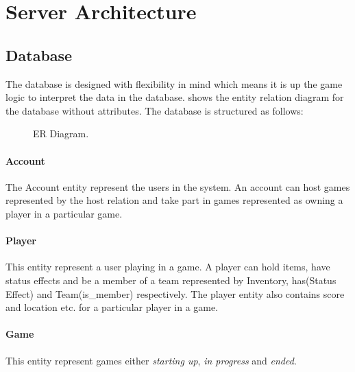 \section{Server Architecture}





\subsection{Database}
The database is designed with flexibility in mind which means it is up the game logic to interpret the data in the database.  shows the entity relation diagram for the database without attributes. The database is structured as follows:

\begin{figure}
  \centering
    
  \caption{ER Diagram.}
  \label{fig:ER}
\end{figure}




\paragraph{Account}
The Account entity represent the users in the system. An account can host games represented by the host relation and take part in games represented as owning a player in a particular game.

\paragraph{Player}
This entity represent a user playing in a game. A player can hold items, have status effects and be a member of a team represented by Inventory, has(Status Effect) and Team(is\_member) respectively. The player entity also contains score and location etc. for a particular player in a game.

\paragraph{Game}
This entity represent games either \textit{starting up}, \textit{in progress} and \textit{ended}.

